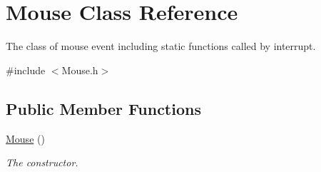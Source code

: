 \hypertarget{classMouse}{}\section{Mouse Class Reference}
\label{classMouse}


The class of mouse event including static functions called by interrupt.  




{\ttfamily \#include $<$Mouse.\+h$>$}

\subsection*{Public Member Functions}
\begin{DoxyCompactItemize}
\item 
\mbox{\label{classMouse_a99024d3700d649ae19c1537b42a3e86d}} 
\hyperlink{classMouse_a99024d3700d649ae19c1537b42a3e86d}{Mouse} ()
\begin{DoxyCompactList}\small\item\em The constructor. \end{DoxyCompactList}\end{DoxyCompactItemize}
